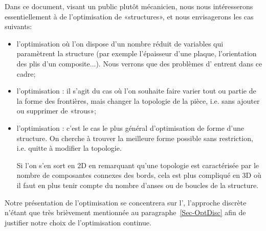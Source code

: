 \medskip
Dans ce document, visant un public plutôt mécanicien, nous nous intéresserons essentiellement à de l'optimisation de «structures», et nous envisagerons les cas suivants:
\begin{itemize}
   \item l'optimisation  où l'on dispose d'un nombre réduit de variables qui paramètrent la structure (par exemple l'épaisseur d'une plaque, l'orientation des plis d'un composite...). Nous verrons que des problèmes d' entrent dans ce cadre;
   \item l'optimisation : il s'agit du cas où l'on souhaite faire varier tout ou partie de la forme des frontières, mais  changer la topologie de la pièce, i.e. sans ajouter ou supprimer de «trous»;
   \item l'optimisation : c'est le cas le plus général d'optimisation de forme d'une structure. On cherche à trouver la meilleure forme possible sans restriction, i.e. quitte à modifier la topologie.

   Si l'on s'en sort en 2D en remarquant qu'une topologie est caractérisée par le nombre de composantes connexes des bords, cela est plus compliqué en 3D où il faut en plus tenir compte du nombre d'anses ou de boucles de la structure.
\end{itemize}

Notre présentation de l'optimisation se concentrera sur l', l'approche discrète n'étant que très brièvement mentionnée au paragraphe~\ref{Sec-OptDisc} afin de justifier notre choix de l'optimisation continue.

